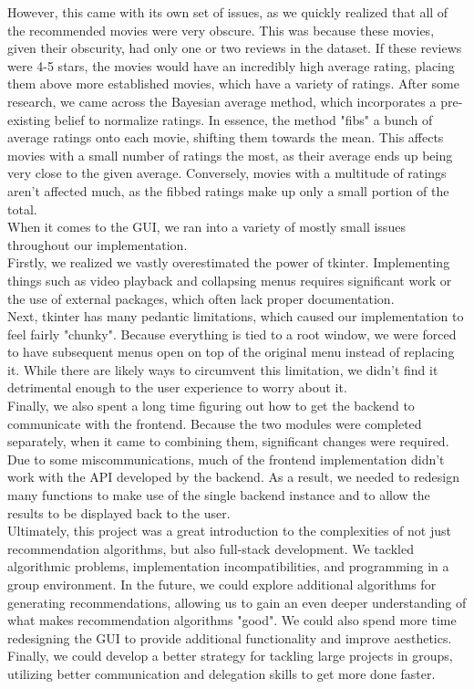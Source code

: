 \documentclass[12pt]{article}
\begin{document}
However, this came with its own set of issues, as we quickly realized that all of the recommended movies were very obscure. This was because these movies, given their obscurity, had only one or two reviews in the dataset. If these reviews were 4-5 stars, the movies would have an incredibly high average rating, placing them above more established movies, which have a variety of ratings. After some research, we came across the Bayesian average method, which incorporates a pre-existing belief to normalize ratings. In essence, the method "fibs" a bunch of average ratings onto each movie, shifting them towards the mean. This affects movies with a small number of ratings the most, as their average ends up being very close to the given average. Conversely, movies with a multitude of ratings aren't affected much, as the fibbed ratings make up only a small portion of the total. \\
When it comes to the GUI, we ran into a variety of mostly small issues throughout our implementation. \\
Firstly, we realized we vastly overestimated the power of tkinter. Implementing things such as video playback and collapsing menus requires significant work or the use of external packages, which often lack proper documentation. \\
Next, tkinter has many pedantic limitations, which caused our implementation to feel fairly "chunky". Because everything is tied to a root window, we were forced to have subsequent menus open on top of the original menu instead of replacing it. While there are likely ways to circumvent this limitation, we didn't find it detrimental enough to the user experience to worry about it. \\
Finally, we also spent a long time figuring out how to get the backend to communicate with the frontend. Because the two modules were completed separately, when it came to combining them, significant changes were required. Due to some miscommunications, much of the frontend implementation didn't work with the API developed by the backend. As a result, we needed to redesign many functions to make use of the single backend instance and to allow the results to be displayed back to the user. \\
Ultimately, this project was a great introduction to the complexities of not just recommendation algorithms, but also full-stack development. We tackled algorithmic problems, implementation incompatibilities, and programming in a group environment. In the future, we could explore additional algorithms for generating recommendations, allowing us to gain an even deeper understanding of what makes recommendation algorithms "good". We could also spend more time redesigning the GUI to provide additional functionality and improve aesthetics. Finally, we could develop a better strategy for tackling large projects in groups, utilizing better communication and delegation skills to get more done faster.
\end{document}
